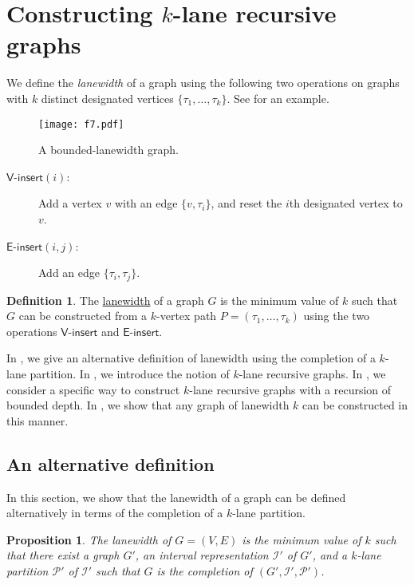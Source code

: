 \documentclass[11pt]{article}
\newtheorem{proposition}[lemma]{Proposition}
\theoremstyle{definition}
\newtheorem{definition}[lemma]{Definition}
\theoremstyle{remark}
\newcommand{\insv}{\mathsf{V}\text{-}\mathsf{insert}}
\newcommand{\inse}{\mathsf{E}\text{-}\mathsf{insert}}
\begin{document}
\section{Constructing \texorpdfstring{$k$}{k}-lane recursive graphs}\label{sect:construction}


We define the \emph{lanewidth} of a graph using the following two operations on graphs with $k$ distinct designated vertices $\{\tau_1, \ldots, \tau_k\}$. See  for an example.

\begin{figure}[ht!]
    \centering
    \texttt{[image: f7.pdf]}
    \caption{A bounded-lanewidth graph.}
    \label{fig:f7}
\end{figure}


\begin{description}
    \item[$\insv(i)$:] Add a vertex $v$ with an edge $\{v, \tau_i\}$, and reset the $i$th designated vertex to $v$.
    \item[$\inse(i,j)$:] Add an edge $\{\tau_i, \tau_j\}$.
\end{description}


\begin{definition}
\label{lanewidth-defn}
The \ul{lanewidth} of a graph $G$ is the minimum value of $k$ such that $G$ can be constructed from a $k$-vertex path $P = (\tau_1, \ldots, \tau_k)$ using the two operations $\insv$ and $\inse$. 
\end{definition}


In , we give an alternative definition of lanewidth using the completion of a $k$-lane partition. 
In , we introduce the notion of $k$-lane recursive graphs.
In , we consider a specific way to construct $k$-lane recursive graphs with a recursion of bounded depth.
In , we show that any graph of lanewidth $k$ can be constructed in this manner.

\subsection{An alternative definition}\label{sect:lanewidth_def}
In this section, we show that the lanewidth of a graph can be defined alternatively in terms of the completion of a $k$-lane partition. 

\begin{proposition}
\label{lanewidth-lem}
The lanewidth of $G=(V,E)$ is the minimum value of $k$ such that there exist a graph $G'$, an interval representation $\mathcal{I}'$ of $G'$, and a $k$-lane partition $\mathcal{P}'$ of $\mathcal{I}'$ such that $G$ is the completion of $(G', \mathcal{I}', \mathcal{P}')$.
\end{proposition}
\end{document}
